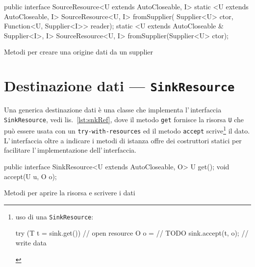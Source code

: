\begin{elisting}[!htb]
\begin{javacode}
public interface SourceResource<U extends AutoCloseable, I> {
    static <U extends AutoCloseable, I> SourceResource<U, I> fromSupplier(
        Supplier<U> ctor, Function<U, Supplier<I>> reader);
    static <U extends AutoCloseable & Supplier<I>, I> SourceResource<U, I> fromSupplier(Supplier<U> ctor);
}
\end{javacode}
\caption{Metodi per creare una origine dati da un supplier}
\label{lst:srcRefSupp}
\end{elisting}


\section{Destinazione dati --- \texttt{SinkResource}} \label{sec:snkRes}
Una generica destinazione dati è una classe che implementa l'\,interfaccia
\texttt{SinkResource}, vedi lis.~\ref{lst:snkRef}, dove il metodo \texttt{get}
fornisce la risorsa \texttt{U} che può essere usata con un
\texttt{try-with-resources} ed il metodo \texttt{accept} scrive\footnote{%
    uso di una \texttt{SinkResource}:
    \begin{javacode}
        try (T t = sink.get()) {    // open resource
        O o = // TODO
        sink.accept(t, o);      // write data
    }
    \end{javacode}
} il dato.
L'\,interfaccia oltre a indicare i metodi di istanza offre dei costruttori
statici per facilitare l'\,implementazione dell'\,interfaccia.

\begin{elisting}[!htb]
\begin{javacode}
public interface SinkResource<U extends AutoCloseable, O> {
    U get();
    void accept(U u, O o);
}
\end{javacode}
\caption{Metodi per aprire la risorsa e scrivere i dati}
\label{lst:snkRef}
\end{elisting}

